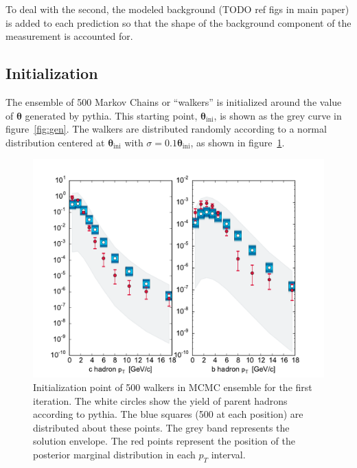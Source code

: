 \documentclass[12pt]{article}
\newcommand{\pt}{p_T}
\newcommand{\thetavec}{\mathbf{\theta}}
\begin{document}
To deal with the second, the modeled background (TODO ref figs in main paper) is added to each prediction so that the shape of the background component of the measurement is accounted for.

\subsection{Initialization} \label{sec:mcmc-init}
The ensemble of 500 Markov Chains or ``walkers'' is initialized around the value of $\thetavec$ generated by pythia. This starting point, $\thetavec_{\mathrm{ini}}$, is shown as the grey curve in figure~\ref{fig:gen}. The walkers are distributed randomly according to a normal distribution centered at $\thetavec_{\mathrm{ini}}$ with $\sigma = 0.1 \thetavec_{\mathrm{ini}}$, as shown in figure~\ref{fig:init}.
\begin{figure}[htb]
  \begin{center}
    \includegraphics[width=\textwidth]{AuAu200MB/1/hpt}
  \end{center}
  \caption{Initialization point of 500 walkers in MCMC ensemble for the first iteration. The white circles show the yield of parent hadrons according to pythia. The blue squares (500 at each position) are distributed about these points. The grey band represents the solution envelope. The red points represent the position of the posterior marginal distribution in each $\pt$ interval.}
  \label{fig:init}
\end{figure}
\end{document}
